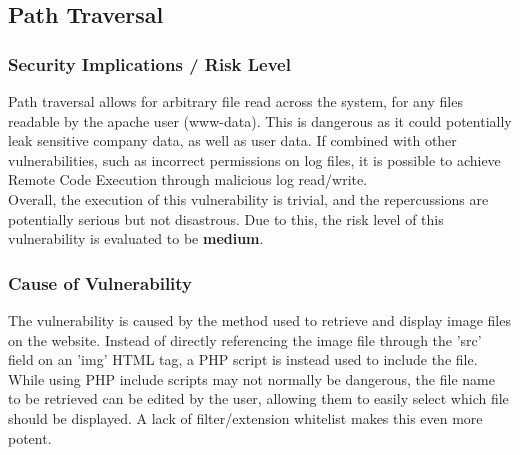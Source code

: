 \documentclass{report}
\begin{document}
\subsection{Path Traversal}
\subsubsection{Security Implications / Risk Level}
Path traversal allows for arbitrary file read across the system, for any files readable by the apache user (www-data). This is dangerous as it could potentially leak sensitive company data, as well as user data. If combined with other vulnerabilities, such as incorrect permissions on log files, it is possible to achieve Remote Code Execution through malicious log read/write.\\
Overall, the execution of this vulnerability is trivial, and the repercussions are potentially serious but not disastrous. Due to this, the risk level of this vulnerability is evaluated to be \textbf{medium}.
\subsubsection{Cause of Vulnerability}
The vulnerability is caused by the method used to retrieve and display image files on the website. Instead of directly referencing the image file through the 'src' field on an 'img' HTML tag, a PHP script is instead used to include the file.\\ 
While using PHP include scripts may not normally be dangerous, the file name to be retrieved can be edited by the user, allowing them to easily select which file should be displayed. A lack of filter/extension whitelist makes this even more potent.
\end{document}
